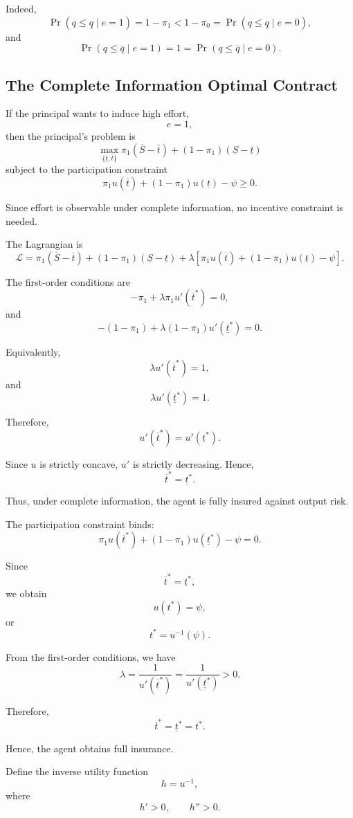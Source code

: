 Indeed,
\[
\Pr(q\le \underline q\mid e=1)
=
1-\pi_1
<
1-\pi_0
=
\Pr(q\le \underline q\mid e=0),
\]
and
\[
\Pr(q\le \overline q\mid e=1)
=
1
=
\Pr(q\le \overline q\mid e=0).
\]

\subsection{The Complete Information Optimal Contract}

If the principal wants to induce high effort,
\[
e=1,
\]
then the principal's problem is
\[
\max_{\{\underline t,\overline t\}}
\pi_1(\overline S-\overline t)
+
(1-\pi_1)(\underline S-\underline t)
\]
subject to the participation constraint
\[
\pi_1u(\overline t)
+
(1-\pi_1)u(\underline t)
-
\psi
\ge 0.
\]

Since effort is observable under complete information, no incentive constraint is needed.

The Lagrangian is
\[
\mathcal{L}
=
\pi_1(\overline S-\overline t)
+
(1-\pi_1)(\underline S-\underline t)
+
\lambda
\left[
\pi_1u(\overline t)
+
(1-\pi_1)u(\underline t)
-
\psi
\right].
\]

The first-order conditions are
\[
-\pi_1+\lambda\pi_1u'(\overline t^*)=0,
\]
and
\[
-(1-\pi_1)+\lambda(1-\pi_1)u'(\underline t^*)=0.
\]

Equivalently,
\[
\lambda u'(\overline t^*)=1,
\]
and
\[
\lambda u'(\underline t^*)=1.
\]

Therefore,
\[
u'(\overline t^*)=u'(\underline t^*).
\]

Since \(u\) is strictly concave, \(u'\) is strictly decreasing. Hence,
\[
\overline t^*=\underline t^*.
\]

Thus, under complete information, the agent is fully insured against output risk.

The participation constraint binds:
\[
\pi_1u(\overline t^*)
+
(1-\pi_1)u(\underline t^*)
-
\psi
=
0.
\]

Since
\[
\overline t^*=\underline t^*,
\]
we obtain
\[
u(t^*)=\psi,
\]
or
\[
t^*=u^{-1}(\psi).
\]



From the first-order conditions, we have
\[
\lambda
=
\frac{1}{u'(\overline t^*)}
=
\frac{1}{u'(\underline t^*)}
>0.
\]

Therefore,
\[
\overline t^*=\underline t^*=t^*.
\]

Hence, the agent obtains full insurance.

Define the inverse utility function
\[
h=u^{-1},
\]
where
\[
h'>0,
\qquad
h''>0.
\]

